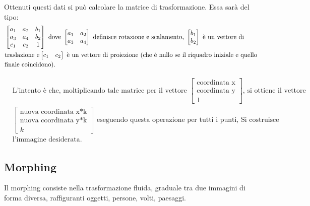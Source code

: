 \vspace{1em} \noindent
Ottenuti questi dati si può calcolare la matrice di trasformazione. Essa sarà del tipo:
\begin{align*}
&\begin{bmatrix}
a_1&a_2&b_1\\
a_3&a_4&b_2\\
c_1&c_2&1
\end{bmatrix}
\text{ dove }
\begin{bmatrix}
a_1&a_2\\
a_3&a_4
\end{bmatrix}
\text{ definisce rotazione e scalamento, } 
\begin{bmatrix}
b_1\\
b_2
\end{bmatrix}
\text{ è un vettore di}\\
&\text{traslazione e} 
\newline
\begin{bmatrix}
c_1&c_2
\end{bmatrix}
\text{ è un vettore di proiezione (che è nullo se il riquadro iniziale e quello}\\
&\text{finale coincidono).}\\
\end{align*}

\vspace{-3em}

\begin{align*}
&\text{L'intento è che, moltiplicando tale matrice per il vettore  }
\begin{bmatrix}
\text{coordinata x}\\
\text{coordinata y}\\
1
\end{bmatrix}
\text{, si ottiene il vettore}\\
&\begin{bmatrix}
\text{nuova coordinata x*k}\\
\text{nuova coordinata y*k}\\
k
\end{bmatrix}
\text{ eseguendo questa operazione per tutti i punti, Si costruisce }\\
&\text{l'immagine desiderata.}
\end{align*}

\subsection{Morphing}
Il morphing consiste nella trasformazione fluida, graduale tra due immagini di forma diversa, raffiguranti oggetti, persone, volti, paesaggi.

